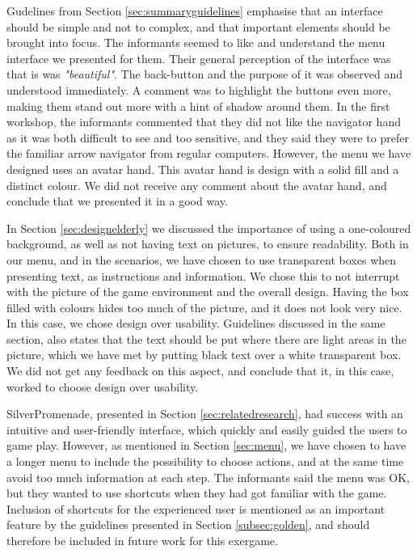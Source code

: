 Gudelines from Section \ref{sec:summaryguidelines} emphasise that an interface should be simple and not to complex, and that important elements should be brought into focus. The informants seemed to like and understand the menu interface we presented for them. Their general perception of the interface was that is was \emph{"beautiful"}. The back-button and the purpose of it was observed and understood immediately. A comment was to highlight the buttons even more, making them stand out more with a hint of shadow around them. In the first workshop, the informants commented that they did not like the navigator hand as it was both difficult to see and too sensitive, and they said they were to prefer the familiar arrow navigator from regular computers. However, the menu we have designed uses an avatar hand. This avatar hand is design with a solid fill and a distinct colour. We did not receive any comment about the avatar hand, and conclude that we presented it in a good way.

In Section \ref{sec:designelderly} we discussed the importance of using a one-coloured background, as well as not having text on pictures, to ensure readability. Both in our menu, and in the scenarios, we have chosen to use transparent boxes when presenting text, as instructions and information. We chose this to not interrupt with the picture of the game environment and the overall design. Having the box filled with colours hides too much of the picture, and it does not look very nice. In this case, we chose design over usability. Guidelines discussed in the same section, also states that the text should be put where there are light areas in the picture, which we have met by putting black text over a white transparent box. We did not get any feedback on this aspect, and conclude that it, in this case, worked to choose design over usability.    

SilverPromenade, presented in Section \ref{sec:relatedresearch}, had success with an intuitive and user-friendly interface, which quickly and easily guided the users to game play. However, as mentioned in Section \ref{sec:menu}, we have chosen to have a longer menu to include the possibility to choose actions, and at the same time avoid too much information at each step. The informants said the menu was OK, but they wanted to use shortcuts when they had got familiar with the game. Inclusion of shortcuts for the experienced user is mentioned as an important feature by the guidelines presented in Section \ref{subsec:golden}, and should therefore be included in future work for this exergame.

